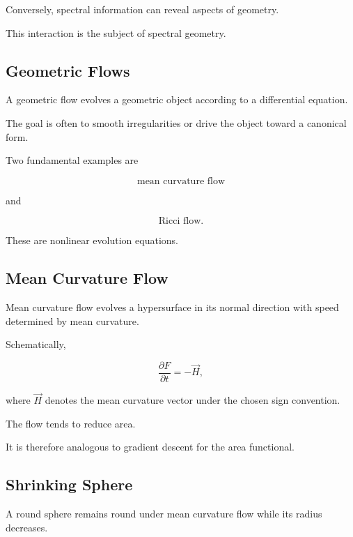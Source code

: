 Conversely, spectral information can reveal aspects of geometry.

This interaction is the subject of spectral geometry.

\subsection{Geometric Flows}
\label{subsec:geometric-flows}

A geometric flow evolves a geometric object according to a differential
equation.

The goal is often to smooth irregularities or drive the object toward a
canonical form.

Two fundamental examples are

\[
\boxed{
\text{mean curvature flow}
}
\]

and

\[
\boxed{
\text{Ricci flow}.
}
\]

These are nonlinear evolution equations.

\subsection{Mean Curvature Flow}
\label{subsec:mean-curvature-flow}

Mean curvature flow evolves a hypersurface in its normal direction with
speed determined by mean curvature.

Schematically,

\[
\boxed{
\frac{\partial F}{\partial t}
=
-\vec H,
}
\]

where \(\vec H\) denotes the mean curvature vector under the chosen sign
convention.

The flow tends to reduce area.

It is therefore analogous to gradient descent for the area functional.

\subsection{Shrinking Sphere}
\label{subsec:mean-curvature-shrinking-sphere}

A round sphere remains round under mean curvature flow while its radius
decreases.

